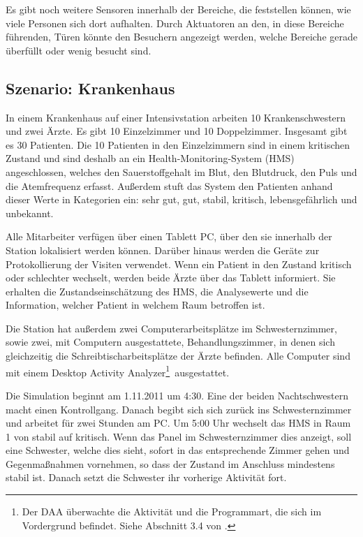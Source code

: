 Es gibt noch weitere Sensoren innerhalb der Bereiche, die feststellen können, wie viele Personen sich dort aufhalten. Durch Aktuatoren an den, in diese Bereiche führenden, Türen könnte den Besuchern angezeigt werden, welche Bereiche gerade überfüllt oder wenig besucht sind.

\subsection*{Szenario: Krankenhaus}

In einem Krankenhaus auf einer Intensivstation arbeiten 10 Krankenschwestern und zwei Ärzte. Es gibt 10 Einzelzimmer und 10 Doppelzimmer. Insgesamt gibt es 30 Patienten. Die 10 Patienten in den Einzelzimmern sind in einem kritischen Zustand und sind deshalb an ein Health-Monitoring-System (HMS) angeschlossen, welches den Sauerstoffgehalt im Blut, den Blutdruck, den Puls und die Atemfrequenz erfasst. Außerdem stuft das System den Patienten anhand dieser Werte in Kategorien ein: sehr gut, gut, stabil, kritisch, lebensgefährlich und unbekannt.

Alle Mitarbeiter verfügen über einen Tablett PC, über den sie innerhalb der Station lokalisiert werden können. Darüber hinaus werden die Geräte zur Protokollierung der Visiten verwendet. Wenn ein Patient in den Zustand kritisch oder schlechter wechselt, werden beide Ärzte über das Tablett informiert. Sie erhalten die Zustandseinschätzung des HMS, die Analysewerte und die Information, welcher Patient in welchem Raum betroffen ist.

Die Station hat außerdem zwei Computerarbeitsplätze im Schwesternzimmer, sowie zwei, mit Computern ausgestattete, Behandlungszimmer, in denen sich gleichzeitig die Schreibtischarbeitsplätze der Ärzte befinden. Alle Computer sind mit einem \glqq Desktop Activity Analyzer\footnote{Der DAA überwachte die Aktivität und die Programmart, die sich im Vordergrund befindet. Siehe Abschnitt 3.4 von \cite{doku-sensor-aktuator}.}\grqq\ ausgestattet.

Die Simulation beginnt am 1.11.2011 um 4:30. Eine der beiden Nachtschwestern macht einen Kontrollgang. Danach begibt sich sich zurück ins Schwesternzimmer und arbeitet für zwei Stunden am PC. Um 5:00 Uhr wechselt das HMS in Raum 1 von stabil auf kritisch. Wenn das Panel im Schwesternzimmer dies anzeigt, soll eine Schwester, welche dies sieht, sofort in das entsprechende Zimmer gehen und Gegenmaßnahmen vornehmen, so dass der Zustand im Anschluss mindestens stabil ist. Danach setzt die Schwester ihr vorherige Aktivität fort. 

